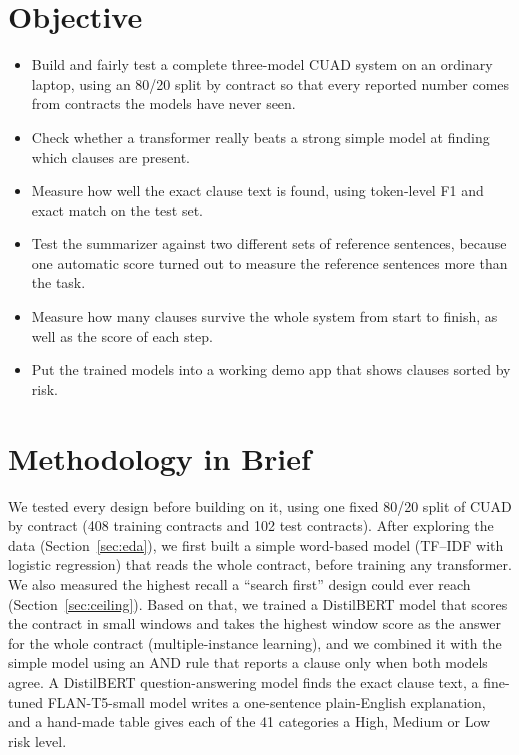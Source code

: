 \section{Objective}
\begin{itemize}[itemsep=2pt]
  \item Build and fairly test a complete three-model CUAD system on an ordinary laptop, using an 80/20 split by contract so that every reported number comes from contracts the models have never seen.
  \item Check whether a transformer really beats a strong simple model at finding which clauses are present.
  \item Measure how well the exact clause text is found, using token-level F1 and exact match on the test set.
  \item Test the summarizer against two different sets of reference sentences, because one automatic score turned out to measure the reference sentences more than the task.
  \item Measure how many clauses survive the whole system from start to finish, as well as the score of each step.
  \item Put the trained models into a working demo app that shows clauses sorted by risk.
\end{itemize}

\section{Methodology in Brief}
We tested every design before building on it, using one fixed 80/20 split of CUAD by contract (408 training contracts and 102 test contracts). After exploring the data (Section~\ref{sec:eda}), we first built a simple word-based model (TF--IDF with logistic regression) that reads the whole contract, before training any transformer. We also measured the highest recall a ``search first'' design could ever reach (Section~\ref{sec:ceiling}). Based on that, we trained a DistilBERT model that scores the contract in small windows and takes the highest window score as the answer for the whole contract (multiple-instance learning), and we combined it with the simple model using an AND rule that reports a clause only when both models agree. A DistilBERT question-answering model finds the exact clause text, a fine-tuned FLAN-T5-small model writes a one-sentence plain-English explanation, and a hand-made table gives each of the 41 categories a High, Medium or Low risk level.


